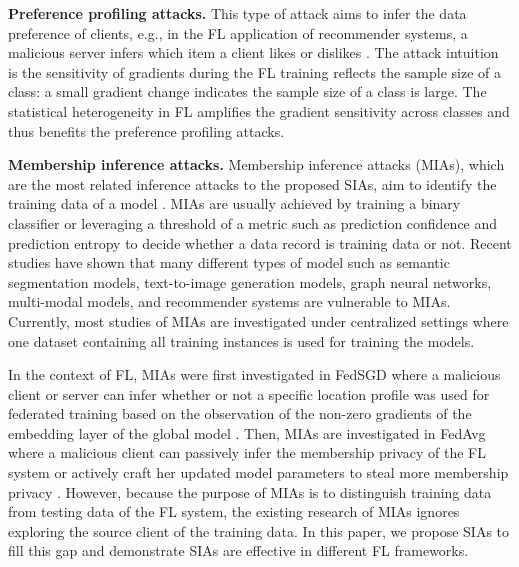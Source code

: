 \documentclass[10pt,journal,compsoc]{IEEEtran}
\begin{document}
\noindent \textbf{Preference profiling attacks. \;} This type of attack aims to infer the data preference of clients, e.g., in the FL application of recommender systems, a malicious server infers which item a client likes or dislikes \cite{zhou2022ppa}. The attack intuition is the sensitivity of gradients during the FL training reflects the sample size of a class: a small gradient change indicates the sample size of a class is large. The statistical heterogeneity in FL amplifies the gradient sensitivity across classes and thus benefits the preference profiling attacks.

\noindent \textbf{Membership inference attacks. \;} {Membership inference attacks (MIAs), which are the most related inference attacks to the proposed SIAs, aim to identify the training data of a model \cite{hu2022membership}. MIAs are usually achieved by training a binary classifier \cite{shokri2017membership} or leveraging a threshold of a metric such as prediction confidence \cite{salem2019ml} and prediction entropy \cite{song2021systematic} to decide whether a data record is training data or not. Recent studies \cite{chobola2022membership,wu2022membership,conti2022label,hu2022m,wang2022debiasing,zhang2022label} have shown that many different types of model such as semantic segmentation models, text-to-image generation models, graph neural networks, multi-modal models, and recommender systems are vulnerable to MIAs. Currently, most studies of MIAs \cite{shokri2017membership,yeom2018privacy,salem2019ml,he2022semi,yuan2022membership,hu2022membershipbackdoor} are investigated under centralized settings where one dataset containing all training instances is used for training the models.}

{In the context of FL, MIAs were first investigated in FedSGD where a malicious client or server can infer whether or not a specific location profile was used for federated training based on the observation of the non-zero gradients of the embedding layer of the global model \cite{melis2019exploiting}. Then, MIAs are investigated in FedAvg where a malicious client can passively infer the membership privacy of the FL system or actively craft her updated model parameters to steal more membership privacy \cite{nasr2019comprehensive}. However, because the purpose of MIAs is to distinguish training data from testing data of the FL system, the existing research of MIAs ignores exploring the source client of the training data. In this paper, we propose SIAs to fill this gap and demonstrate SIAs are effective in different FL frameworks.}
\end{document}
